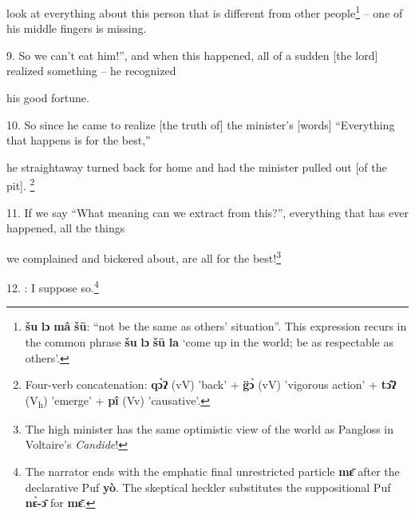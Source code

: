 look at everything about this person that is different from other people\footnote{\textbf{šu} \textbf{lɔ} \textbf{mâ} \textbf{šū}: ``not be the same as others' situation''. This expression recurs in the common phrase \textbf{šu} \textbf{lɔ} \textbf{šū} \textbf{la} `come up in the world; be as respectable as others'.} --
one of his middle fingers is missing.

9. So we can't eat him!'', and when this happened, all of a sudden [the lord] realized
something -- he recognized

his good fortune.

10. So since he came to realize [the truth of] the minister's [words] ``Everything
that happens is for the best,''

he straightaway turned back for home and had the minister pulled out [of the pit].
\footnote{Four-verb concatenation: \textbf{qɔ̀ʔ} (vV) 'back' + \textbf{g̈ɔ̀} (vV) 'vigorous action' + \textbf{tɔ̂ʔ} (V\textsubscript{h}) 'emerge' + \textbf{pî} (Vv) 'causative'.}

11. If we say ``What meaning can we extract from this?'', everything that has ever
happened, all the things

we complained and bickered about, are all for the best!\footnote{The high minister has the same optimistic view of the world as Pangloss in Voltaire's \textit{Candide}!}

12.  : I suppose so.\footnote{The narrator ends with the emphatic final unrestricted particle \textbf{mɛ̄} after the declarative Puf \textbf{yò}. The skeptical heckler substitutes the suppositional Puf \textbf{nɛ̀-ɔ̄} for \textbf{mɛ̄}.}

